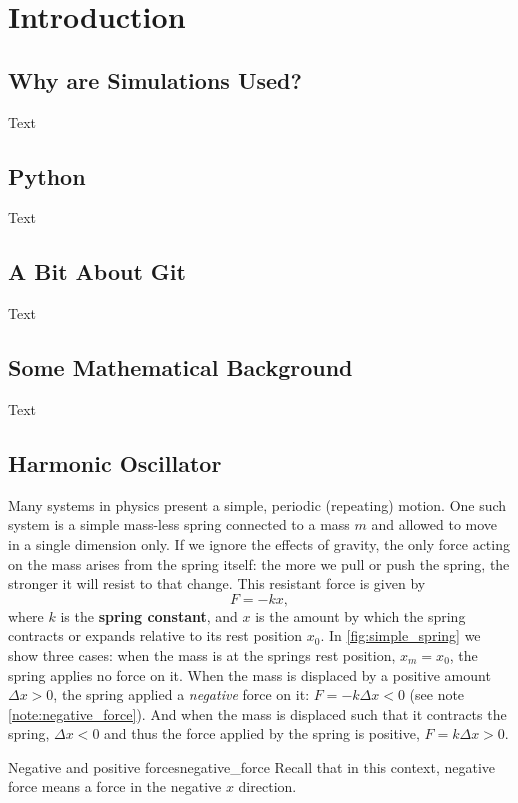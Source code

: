 \chapter{Introduction}

\section{Why are Simulations Used?}
Text

\section{Python}
Text
\section{A Bit About Git}
Text

\section{Some Mathematical Background}
Text

\section{Harmonic Oscillator}
Many systems in physics present a simple, periodic (repeating) motion. One such system is a simple mass-less spring connected to a mass $m$ and allowed to move in a single dimension only. If we ignore the effects of gravity, the only force acting on the mass arises from the spring itself: the more we pull or push the spring, the stronger it will resist to that change. This resistant force is given by
\begin{equation}
  F = -kx,
  \label{eq:spring_force}
\end{equation}
where $k$ is the \textbf{spring constant}, and $x$ is the amount by which the spring contracts or expands relative to its rest position $x_{0}$. In \autoref{fig:simple_spring} we show three cases: when the mass is at the springs rest position, $x_{m}=x_{0}$, the spring applies no force on it. When the mass is displaced by a positive amount $\Delta x>0$, the spring applied a \textit{negative} force on it: $F=-k\Delta x<0$ (see note \autoref{note:negative_force}). And when the mass is displaced such that it contracts the spring, $\Delta x<0$ and thus the force applied by the spring is positive, $F=k\Delta x>0$.

\begin{note}{Negative and positive forces}{negative_force}
  Recall that in this context, negative force means a force in the negative $x$ direction.
\end{note}

